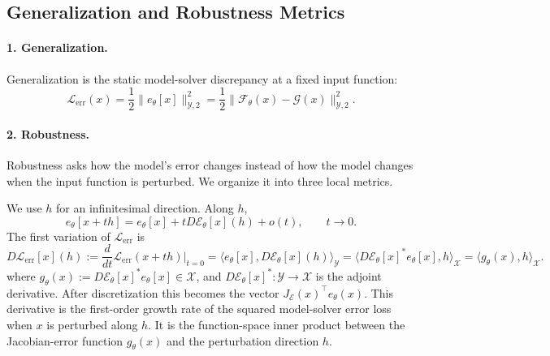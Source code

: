 \documentclass{article}
\begin{document}
\subsection{Generalization and Robustness Metrics}

\paragraph{1. Generalization.}
Generalization is the static model-solver discrepancy at a fixed input
function:
\begin{equation*}
  \mathcal{L}_{\mathrm{err}}(x)
  =
  \frac{1}{2}\|e_\theta[x]\|_{\mathcal{Y},2}^{2}
  =
  \frac{1}{2}
  \|\mathcal{F}_\theta(x)-\mathcal{G}(x)\|_{\mathcal{Y},2}^{2}.
\end{equation*}

\paragraph{2. Robustness.}
Robustness asks how the model's error changes instead of how the model changes
when the input function is perturbed. We organize it into three local metrics.

We use $h$ for an infinitesimal direction. Along $h$,
\begin{equation*}
  e_\theta[x+t h]
  =
  e_\theta[x]+tD\mathcal{E}_\theta[x](h)+o(t),
  \qquad t\to 0.
\end{equation*}
The first variation of $\mathcal{L}_{\mathrm{err}}$ is
\begin{equation*}
D\mathcal{L}_{\mathrm{err}}[x](h):=\frac{d}{dt}\mathcal{L}_{\mathrm{err}}(x+t h)\big|_{t=0}=\langle e_\theta[x],D\mathcal{E}_\theta[x](h)\rangle_{\mathcal{Y}}=\langle D\mathcal{E}_\theta[x]^*e_\theta[x],h\rangle_{\mathcal{X}}=\langle g_\theta(x),h\rangle_{\mathcal{X}}.
\end{equation*}
where $g_\theta(x):=D\mathcal{E}_\theta[x]^*e_\theta[x]\in\mathcal{X}$, and
$D\mathcal{E}_\theta[x]^*:\mathcal{Y}\to\mathcal{X}$ is the adjoint derivative.
After discretization this becomes the vector
$J_{\mathcal{E}}(x)^\top e_\theta(x)$.
This derivative is the first-order growth rate of the squared model-solver error
loss when $x$ is perturbed along $h$. It is the function-space inner product
between the Jacobian-error function $g_\theta(x)$ and the perturbation direction
$h$.
\end{document}
